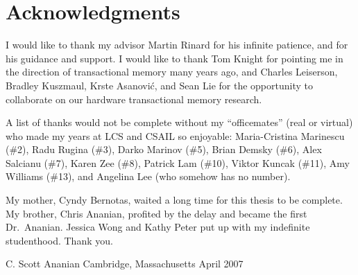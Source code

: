 \clearpage
\section*{Acknowledgments}

I would like to thank my advisor Martin Rinard for his infinite
patience, and for his guidance and support.  I would like to thank Tom
Knight for pointing me in the direction of transactional memory many
years ago, and Charles Leiserson, Bradley Kuszmaul, Krste Asanovi\'c,
and Sean Lie for the opportunity to collaborate on our
hardware transactional memory research.

A list of thanks would not be complete without
my ``officemates'' (real or virtual) who made my
years at LCS and CSAIL so enjoyable: Maria-Cristina Marinescu (\#2),
Radu Rugina (\#3), Darko Marinov (\#5), Brian Demsky (\#6), Alex
Salcianu (\#7), Karen Zee (\#8), Patrick Lam (\#10), Viktor Kuncak (\#11), 
Amy Williams (\#13), and Angelina Lee (who somehow has no number).

My mother, Cyndy Bernotas, waited a long time for this thesis to be
complete.  My brother, Chris Ananian, profited by the delay and became
the first Dr.~Ananian.  Jessica Wong and Kathy Peter put up with my
indefinite studenthood.  Thank you.

\begin{flushright}
C. Scott Ananian\tight
Cambridge, Massachusetts\tight
April 2007
\end{flushright}

